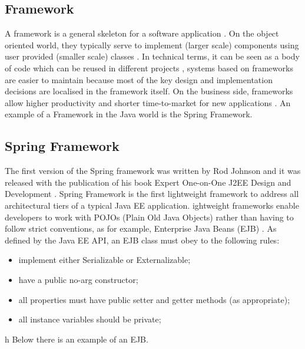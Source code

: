 \subsection{Framework}

A framework is a general skeleton for a software application \cite{Liu1996SmalltalkDesign}. On the object oriented world, they typically serve to implement (larger scale) components using user provided (smaller scale) classes \cite{Riehle200FrameworkApproach}. In technical terms, it can be seen as a body of code which can be reused in different projects \cite{Liu1996SmalltalkDesign}, systems based on frameworks are easier to maintain because most of the key design and implementation decisions are localised in the framework itself.  On the business side, frameworks allow higher productivity and shorter time-to-market for new applications \cite{Riehle200FrameworkApproach}.
An example of a Framework in the Java world is the Spring Framework.

\subsection{Spring Framework}

The first version of the Spring framework was written by Rod Johnson and it was released with the publication of his book Expert One-on-One J2EE Design and Development \cite{Johnson2003ExpertDevelopment}. Spring Framework is the first lightweight framework to address all architectural tiers of a typical Java EE application. ightweight frameworks enable developers to work with POJOs (Plain Old Java Objects) rather than having to follow strict conventions, as for example, Enterprise Java Beans (EJB) \cite{SunMicrosystemsJSRSpecification, Johnson2005ProfessionalFramework, Johnson2003ExpertDevelopment}. As defined by the Java EE API, an EJB class must obey to the following rules:

\begin{itemize}
	\item implement either Serializable or Externalizable;
	\item have a public no-arg constructor;
	\item all properties must have public setter and getter methods (as appropriate);
	\item all instance variables should be private;
\end{itemize}
h
Below there is an example of an EJB.




